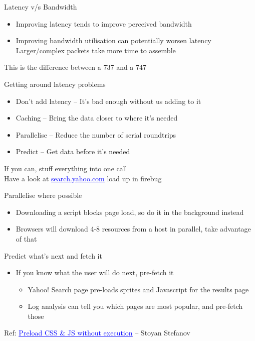 \documentclass{beamer}
\begin{document}
\begin{frame}{Latency v/s Bandwidth}
  \begin{itemize}
  \item Improving latency tends to improve perceived bandwidth
  \item Improving bandwidth utilisation can potentially worsen latency \\
        \tiny{Larger/complex packets take more time to assemble}
  \end{itemize}
  This is the difference between a 737 and a 747
\end{frame}

\begin{frame}{Getting around latency problems}
  \begin{itemize}
  \item Don't add latency -- It's bad enough without us adding to it
  \item Caching -- Bring the data closer to where it's needed
  \item Parallelise -- Reduce the number of serial roundtrips
  \item Predict -- Get data before it's needed
  \end{itemize}
\end{frame}


\begin{frame}{}
  \begin{center}
    If you can, stuff everything into one call \\
    \footnotesize{Have a look at \href{http://search.yahoo.com/}{\textcolor{blue}{\underline{search.yahoo.com}}} load up in firebug}
  \end{center}
\end{frame}

\begin{frame}{Parallelise where possible}
  \begin{itemize}
  \item Downloading a script blocks page load, so do it in the background instead
  \item Browsers will download 4-8 resources from a host in parallel, take advantage of that
  \end{itemize}
\end{frame}

\begin{frame}{Predict what's next and fetch it}
  \begin{itemize}
  \item If you know what the user will do next, pre-fetch it
    \begin{itemize}
    \item Yahoo! Search page pre-loads sprites and Javascript for the results page
    \item Log analysis can tell you which pages are most popular, and pre-fetch those
    \end{itemize}
  \end{itemize}
  \vfill
  \tiny{Ref: \href{http://www.phpied.com/preload-cssjavascript-without-execution/}{\textcolor{blue}{\underline{Preload CSS \& JS without execution}}} -- Stoyan Stefanov}
\end{frame}
\end{document}
